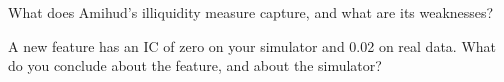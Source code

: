 \begin{interviewq}\label{iq:rs:price-and-volume-features:5}
What does Amihud's illiquidity measure capture, and what are its weaknesses?
\end{interviewq}

\begin{interviewq}\label{iq:rs:price-and-volume-features:6}
A new feature has an IC of zero on your simulator and 0.02 on real data. What do you conclude about the feature, and about the simulator?
\end{interviewq}
